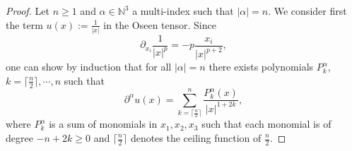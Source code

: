 \documentclass[AHL,Unicode,longabstracts,published]{cedram}
\newcommand{\N}{\mathbb{N}}
\renewcommand{\geq}{\geqslant}
\begin{document}
\begin{proof}
Let $n\geq 1$ and $\alpha \in \N^3$ a multi-index such that $|\alpha|=n $. We consider first the term $u(x):=\frac{1}{|x|}$ in the Oseen tensor. Since
\begin{equation}\label{marre}
\partial_{x_i} \frac{1}{|x|^p}=-p \frac{x_i}{|x|^{p+2}},
\end{equation}
one can show by induction that for all $|\alpha|=n$ there exists polynomials $P_k^\alpha$, $k=\lceil\frac{n}{2}\rceil,\cdots, n$ such that
\begin{equation}\label{eq:reccurence}
\partial^\alpha u(x)=\underset{k=\lceil \frac{n}{2}\rceil }{\overset{n}{\sum}} \frac{P_k^\alpha(x)}{|x|^{1+2k}},
\end{equation}
where $P_k^\alpha$ is a sum of monomials in $x_1,x_2,x_3$ such that each monomial is of degree $ -n+2k \geq 0 $ and $\lceil \frac{n}{2}\rceil$ denotes the ceiling function of $\frac{n}{2}$.


\end{proof}
\end{document}

